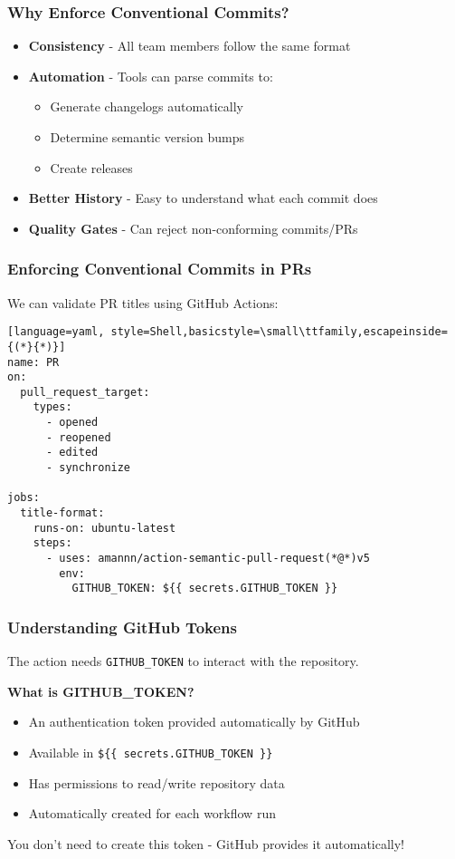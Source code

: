 \begin{frame}
	\frametitle{Why Enforce Conventional Commits?}
	\begin{itemize}[<+->]
		\item \textbf{Consistency} - All team members follow the same format
		\item \textbf{Automation} - Tools can parse commits to:
		\begin{itemize}
			\item Generate changelogs automatically
			\item Determine semantic version bumps
			\item Create releases
		\end{itemize}

		\item \textbf{Better History} - Easy to understand what each commit does

		\item \textbf{Quality Gates} - Can reject non-conforming commits/PRs
	\end{itemize}
\end{frame}

\begin{frame}[fragile]
	\frametitle{Enforcing Conventional Commits in PRs}
	{\footnotesize We can validate PR titles using GitHub Actions:}
	\begin{lstlisting}[language=yaml, style=Shell,basicstyle=\small\ttfamily,escapeinside={(*}{*)}]
name: PR
on:
  pull_request_target:
    types:
      - opened
      - reopened
      - edited
      - synchronize

jobs:
  title-format:
    runs-on: ubuntu-latest
    steps:
      - uses: amannn/action-semantic-pull-request(*@*)v5
        env:
          GITHUB_TOKEN: ${{ secrets.GITHUB_TOKEN }}
	\end{lstlisting}
\end{frame}

\begin{frame}
	\frametitle{Understanding GitHub Tokens}
	\begin{warning}
		{The action needs \texttt{GITHUB\_TOKEN} to interact with the repository.}
	\end{warning}
	\pause
	\textbf{What is GITHUB\_TOKEN?}
	\begin{itemize}
		\item An authentication token provided automatically by GitHub
		\item Available in \texttt{\$\{\{ secrets.GITHUB\_TOKEN \}\}}
		\item Has permissions to read/write repository data
		\item Automatically created for each workflow run
	\end{itemize}
	\pause
	\begin{docs}
		{You don't need to create this token - GitHub provides it automatically!}
	\end{docs}
\end{frame}

